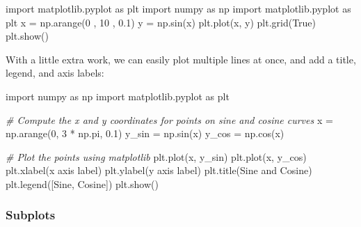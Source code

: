 \documentclass[
]{article}
\newenvironment{Shaded}{}{}
\newcommand{\CommentTok}[1]{\textcolor[rgb]{0.38,0.63,0.69}{\textit{#1}}}
\newcommand{\DecValTok}[1]{\textcolor[rgb]{0.25,0.63,0.44}{#1}}
\newcommand{\FloatTok}[1]{\textcolor[rgb]{0.25,0.63,0.44}{#1}}
\newcommand{\ImportTok}[1]{#1}
\newcommand{\NormalTok}[1]{#1}
\newcommand{\OperatorTok}[1]{\textcolor[rgb]{0.40,0.40,0.40}{#1}}
\newcommand{\StringTok}[1]{\textcolor[rgb]{0.25,0.44,0.63}{#1}}
\newcommand{\VariableTok}[1]{\textcolor[rgb]{0.10,0.09,0.49}{#1}}
\begin{document}
\begin{Shaded}
\begin{Highlighting}[]
\ImportTok{import}\NormalTok{ matplotlib.pyplot }\ImportTok{as}\NormalTok{ plt }
\ImportTok{import}\NormalTok{ numpy }\ImportTok{as}\NormalTok{ np}
\ImportTok{import}\NormalTok{ matplotlib.pyplot }\ImportTok{as}\NormalTok{ plt }
\NormalTok{x }\OperatorTok{=}\NormalTok{ np.arange(}\DecValTok{0}\NormalTok{ , }\DecValTok{10}\NormalTok{ , }\FloatTok{0.1}\NormalTok{)}
\NormalTok{y }\OperatorTok{=}\NormalTok{ np.sin(x) }
\NormalTok{plt.plot(x, y)  }
\NormalTok{plt.grid(}\VariableTok{True}\NormalTok{)}
\NormalTok{plt.show()}
\end{Highlighting}
\end{Shaded}

With a little extra work, we can easily plot multiple lines at once, and
add a title, legend, and axis labels:

\begin{Shaded}
\begin{Highlighting}[]
\ImportTok{import}\NormalTok{ numpy }\ImportTok{as}\NormalTok{ np}
\ImportTok{import}\NormalTok{ matplotlib.pyplot }\ImportTok{as}\NormalTok{ plt}

\CommentTok{\# Compute the x and y coordinates for points on sine and cosine curves}
\NormalTok{x }\OperatorTok{=}\NormalTok{ np.arange(}\DecValTok{0}\NormalTok{, }\DecValTok{3} \OperatorTok{*}\NormalTok{ np.pi, }\FloatTok{0.1}\NormalTok{)}
\NormalTok{y\_sin }\OperatorTok{=}\NormalTok{ np.sin(x)}
\NormalTok{y\_cos }\OperatorTok{=}\NormalTok{ np.cos(x)}

\CommentTok{\# Plot the points using matplotlib}
\NormalTok{plt.plot(x, y\_sin)}
\NormalTok{plt.plot(x, y\_cos)}
\NormalTok{plt.xlabel(}\StringTok{\textquotesingle{}x axis label\textquotesingle{}}\NormalTok{)}
\NormalTok{plt.ylabel(}\StringTok{\textquotesingle{}y axis label\textquotesingle{}}\NormalTok{)}
\NormalTok{plt.title(}\StringTok{\textquotesingle{}Sine and Cosine\textquotesingle{}}\NormalTok{)}
\NormalTok{plt.legend([}\StringTok{\textquotesingle{}Sine\textquotesingle{}}\NormalTok{, }\StringTok{\textquotesingle{}Cosine\textquotesingle{}}\NormalTok{])}
\NormalTok{plt.show()}
\end{Highlighting}
\end{Shaded}

\hypertarget{subplots}{%
\subsubsection{Subplots}\label{subplots}}
\end{document}
